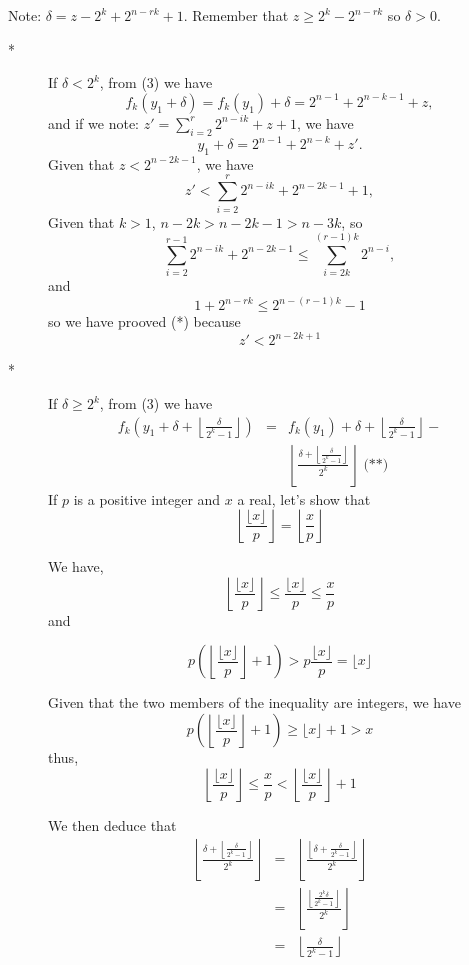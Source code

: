 \documentclass[a4paper,12pt]{article}
\begin{document}
\begin{itemize}
Note: $\delta = z - 2^k + 2^{n-rk} + 1$.  Remember that $z \ge 2^k - 2^{n-rk}$ 
so $\delta > 0$.

\begin{description}
\item[*]
If $\delta < 2^k$, from (3) we have
\[f_k(y_1 + \delta) = f_k(y_1) + \delta = 2^{n-1} + 2^{n-k-1} + z,\]
and if we note: $z' = \sum_{i=2}^r2^{n-ik} + z + 1$, we have
\[ y_1 + \delta = 2^{n-1} + 2^{n-k} + z'.\]
Given that $z < 2^{n-2k-1}$, we have
\[ z' < \sum_{i=2}^r 2^{n-ik} + 2^{n-2k-1} + 1,\]
Given that $k > 1$, $n-2k > n-2k-1 > n-3k$, so
\[ \sum_{i=2}^{r-1}2^{n-ik} + 2^{n-2k-1} \le \sum_{i=2k}^{(r-1)k}2^{n-i},\]
and
\[ 1+2^{n-rk} \le 2^{n-(r-1)k} - 1\]
so we have prooved (*) because
\[z' < 2^{n-2k+1}\]
\item[*]
If $\delta \ge 2^k$, from (3) we have
\begin{eqnarray*}
f_k\left(y_1 + \delta + \left\lfloor\frac{\delta}{2^k-1}\right\rfloor\right)&=&
f_k(y_1) + \delta + \left\lfloor\frac{\delta}{2^k-1}\right\rfloor - \\&&
\left\lfloor\frac{\delta + \left\lfloor
\frac{\delta}{2^k-1}\right\rfloor}{2^k}\right\rfloor \mbox{ (**)}
\end{eqnarray*}
If $p$ is a positive integer and $x$ a real, let's show that
\[ \left\lfloor\frac{\lfloor x \rfloor}{p}\right\rfloor =
\left\lfloor\frac{x}{p}\right\rfloor\]

We have,
\[\left\lfloor\frac{\lfloor x \rfloor}{p}\right\rfloor \le
\frac{\lfloor x \rfloor}{p} \le \frac{x}{p}\] and

\[p\left(\left\lfloor\frac{\lfloor x \rfloor}{p}\right\rfloor + 1\right) >
p \frac{\lfloor x \rfloor}{p} = \lfloor x \rfloor\]

Given that the two members of the inequality are integers, we have
\[p\left(\left\lfloor\frac{\lfloor x \rfloor}{p}\right\rfloor + 1\right) \ge
\lfloor x \rfloor + 1 > x\]
thus,
\[\left\lfloor\frac{\lfloor x \rfloor}{p}\right\rfloor \le \frac{x}{p} <
\left\lfloor\frac{\lfloor x \rfloor}{p}\right\rfloor + 1\]

We then deduce that
\begin{eqnarray*}
\left\lfloor\frac{\delta + \left\lfloor\frac{\delta}{2^k-1}\right\rfloor}{2^k}
\right\rfloor & = &
\left\lfloor\frac{\left\lfloor \delta + \frac{\delta}{2^k-1}\right\rfloor}{2^k}
\right\rfloor\\ & = &
\left\lfloor\frac{\left\lfloor \frac{2^k\delta}{2^k-1}\right\rfloor}{2^k}
\right\rfloor\\ & = &
\left\lfloor\frac{\delta}{2^k-1}\right\rfloor
\end{eqnarray*}


\end{description}
\end{itemize}
\end{document}
